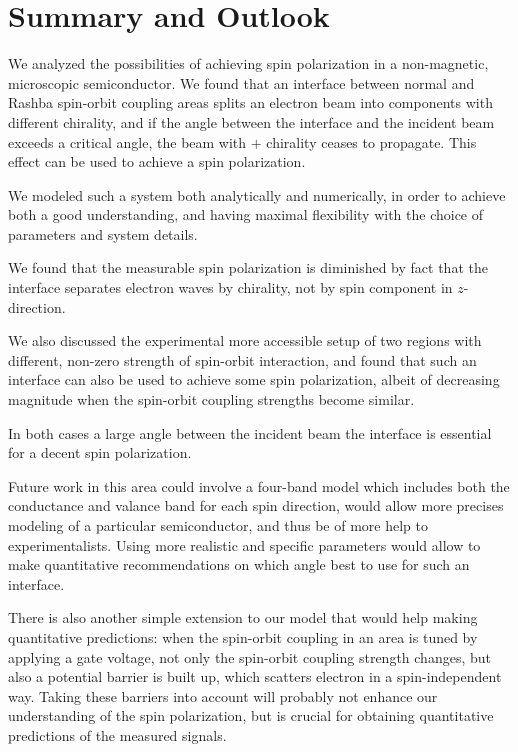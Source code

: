 \chapter{Summary and Outlook}
\label{sec:summary}

We analyzed the possibilities of achieving spin polarization in a
non-magnetic, microscopic semiconductor. We found that an interface between
normal and Rashba spin-orbit coupling areas splits an electron beam into
components with different chirality, and if the angle between the interface
and the incident beam exceeds a critical angle, the beam with $+$ chirality
ceases to propagate. This effect can be used to achieve a spin polarization.

We modeled such a system both analytically and numerically, in order to
achieve both a good understanding, and having maximal flexibility with the
choice of parameters and system details.

We found that the measurable spin polarization is diminished by fact that the
interface separates electron waves by chirality, not by spin component
in $z$-direction.

We also discussed the experimental more accessible setup of two regions with
different, non-zero strength of spin-orbit interaction, and found that such an
interface can also be used to achieve some spin polarization, albeit
of decreasing magnitude when the spin-orbit coupling strengths become similar. 

In both cases a large angle between the incident beam the interface is
essential for a decent spin polarization.


Future work in this area could involve a four-band model which includes both
the conductance and valance band for each spin direction, would
allow more precises modeling of a particular semiconductor, and thus be of
more help to experimentalists. Using more realistic and specific parameters
would allow to make quantitative recommendations on which angle best to use
for such an interface.

There is also another simple extension to our model that would help making
quantitative predictions: when the spin-orbit coupling in an area is tuned by
applying a gate voltage, not only the spin-orbit coupling strength changes,
but also a potential barrier is built up, which scatters electron in a
spin-independent way. Taking these barriers into account will probably not
enhance our understanding of the spin polarization, but is crucial for
obtaining quantitative predictions of the measured signals.

